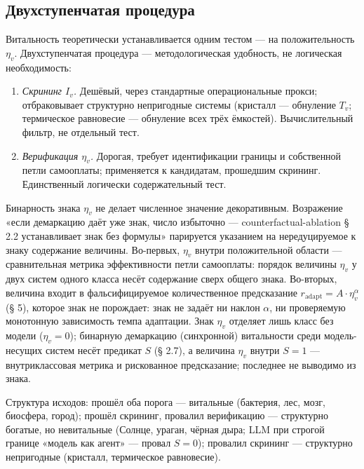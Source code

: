 \documentclass[pdflatex,sn-mathphys-ay]{sn-jnl}
\providecommand{\tightlist}{\setlength{\itemsep}{0pt}\setlength{\parskip}{0pt}}
\begin{document}
\subsection{Двухступенчатая процедура}\label{ux434ux432ux443ux445ux441ux442ux443ux43fux435ux43dux447ux430ux442ux430ux44f-ux43fux440ux43eux446ux435ux434ux443ux440ux430}

Витальность теоретически устанавливается одним тестом --- на положительность \(\eta_v\). Двухступенчатая процедура --- методологическая удобность, не логическая необходимость:

\begin{enumerate}
\def\labelenumi{\arabic{enumi}.}
\tightlist
\item
  \emph{Скрининг \(I_v\).} Дешёвый, через стандартные операциональные прокси; отбраковывает структурно непригодные системы (кристалл --- обнуление \(T_v\); термическое равновесие --- обнуление всех трёх ёмкостей). Вычислительный фильтр, не отдельный тест.
\item
  \emph{Верификация \(\eta_v\).} Дорогая, требует идентификации границы и собственной петли самооплаты; применяется к кандидатам, прошедшим скрининг. Единственный логически содержательный тест.
\end{enumerate}

Бинарность знака \(\eta_v\) не делает численное значение декоративным. Возражение «если демаркацию даёт уже знак, число избыточно --- counterfactual-ablation § 2.2 устанавливает знак без формулы» парируется указанием на нередуцируемое к знаку содержание величины. Во-первых, \(\eta_v\) внутри положительной области --- сравнительная метрика эффективности петли самооплаты: порядок величины \(\eta_v\) у двух систем одного класса несёт содержание сверх общего знака. Во-вторых, величина входит в фальсифицируемое количественное предсказание \(r_{\text{adapt}} = A \cdot \eta_v^{\alpha}\) (§ 5), которое знак не порождает: знак не задаёт ни наклон \(\alpha\), ни проверяемую монотонную зависимость темпа адаптации. Знак \(\eta_v\) отделяет лишь класс без модели (\(\eta_v = 0\)); бинарную демаркацию (синхронной) витальности среди модель-несущих систем несёт предикат \(S\) (§ 2.7), а величина \(\eta_v\) внутри \(S = 1\) --- внутриклассовая метрика и рискованное предсказание; последнее не выводимо из знака.

Структура исходов: прошёл оба порога --- витальные (бактерия, лес, мозг, биосфера, город); прошёл скрининг, провалил верификацию --- структурно богатые, но невитальные (Солнце, ураган, чёрная дыра; LLM при строгой границе «модель как агент» --- провал \(S = 0\)); провалил скрининг --- структурно непригодные (кристалл, термическое равновесие).
\end{document}
